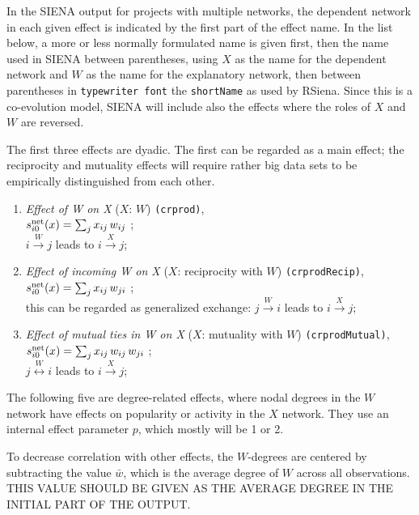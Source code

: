 \documentclass[a4paper,fleqn,11pt]{article}
\newcommand{\+}{\, + \,}
\newcommand{\vit}{\theenumi}
\newcommand{\rs}{{\sf RSiena}}
\newcommand{\SI}{{\sf SIENA }}
\newcounter{savenumi}
\begin{document}
In the \SI output for projects with multiple networks,
the dependent network in each given effect is indicated by
the first part of the effect name.
In the list below, a more or less normally formulated name is given first, then the
name used in \SI between parentheses,
using $X$ as the name for the dependent network and $W$
as the name for the explanatory network,
then between parentheses in \texttt{typewriter font} the \texttt{shortName}
as used by \rs.
Since this is a co-evolution model, \SI will include also the effects
where the roles of $X$ and $W$ are reversed.

The first three effects are dyadic. The first can be regarded
as a main effect; the reciprocity and mutuality effects
will require rather big data sets to be empirically distinguished
from each other.
\begin{enumerate}
 \item {\em Effect of W on X} ($X$: $W$)  \texttt{(crprod)},\\
 $s^{\rm net}_{i\vit}(x) = \sum_j x_{ij} \, w_{ij}  $ ;\\
 $i \stackrel{W}{\rightarrow} j$ leads to  $i \stackrel{X}{\rightarrow} j$;

 \item {\em Effect of incoming W on X} ($X$: reciprocity with $W$)  \texttt{(crprodRecip)},\\
 $s^{\rm net}_{i\vit}(x) = \sum_j x_{ij} \, w_{ji}  $ ;\\
 this can be regarded as generalized exchange:
 $j \stackrel{W}{\rightarrow} i$ leads to  $i \stackrel{X}{\rightarrow} j$;

 \item {\em Effect of mutual ties in W on X} ($X$: mutuality with $W$)  \texttt{(crprodMutual)},\\
 $s^{\rm net}_{i\vit}(x) = \sum_j x_{ij} \, w_{ij} \, w_{ji}  $ ;\\
 $j \stackrel{W}{\leftrightarrow} i$ leads to  $i \stackrel{X}{\rightarrow} j$;
\setcounter{savenumi}{\value{enumi}}
\end{enumerate}
\smallskip
The following five are degree-related effects, where nodal degrees
in the $W$ network have effects on popularity or activity in the
$X$  network. They use an internal effect parameter $p$, which
mostly will be 1 or 2.

To decrease correlation with other effects, the
$W$-degrees are centered by subtracting the value $\bar w$,
which is the average degree of $W$ across all observations.\\
THIS VALUE SHOULD BE GIVEN AS THE AVERAGE DEGREE IN THE INITIAL PART
OF THE OUTPUT.
\end{document}
